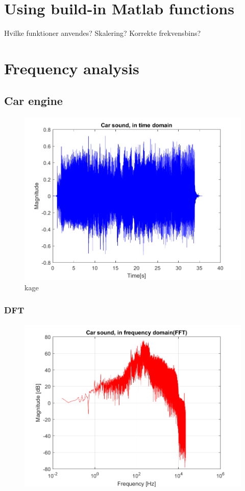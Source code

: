 

\section{Using build-in Matlab functions}
Hvilke funktioner anvendes?
Skalering?
Korrekte frekvensbins?



\section{Frequency analysis}
\subsection{Car engine}

\begin{figure}
	\includegraphics[width=\textwidth]{code/Car_figure1.png}
	\caption{kage}
	\label{fig:Car_figure1:1}
\end{figure}

\subsubsection{DFT}
\begin{figure}
	\centering
	\includegraphics[width=\textwidth]{code/Car_figure2.png}
	\caption{}
	\label{fig:Car_figure2:2}
\end{figure}




